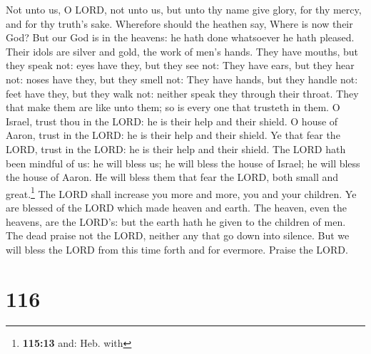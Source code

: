  Not unto us, O LORD, not unto us, but unto thy name give
glory, for thy mercy, and for thy truth's sake.  Wherefore
should the heathen say, Where is now their God?  But our
God is in the heavens: he hath done whatsoever he hath pleased.
 Their idols are silver and gold, the work of men's hands.
 They have mouths, but they speak not: eyes have they, but
they see not:  They have ears, but they hear not: noses
have they, but they smell not:  They have hands, but they
handle not: feet have they, but they walk not: neither speak they
through their throat.  They that make them are like unto
them; so is every one that trusteth in them.  O Israel,
trust thou in the LORD: he is their help and their shield.
 O house of Aaron, trust in the LORD: he is their help
and their shield.  Ye that fear the LORD, trust in the
LORD: he is their help and their shield.  The LORD hath
been mindful of us: he will bless us; he will bless the house of Israel;
he will bless the house of Aaron.  He will bless them
that fear the LORD, both small and great.\footnote{\textbf{115:13} and:
  Heb. with}  The LORD shall increase you more and more,
you and your children.  Ye are blessed of the LORD which
made heaven and earth.  The heaven, even the heavens, are
the LORD's: but the earth hath he given to the children of men.
 The dead praise not the LORD, neither any that go down
into silence.  But we will bless the LORD from this time
forth and for evermore. Praise the LORD.

\hypertarget{section-115}{%
\section{116}\label{section-115}}

